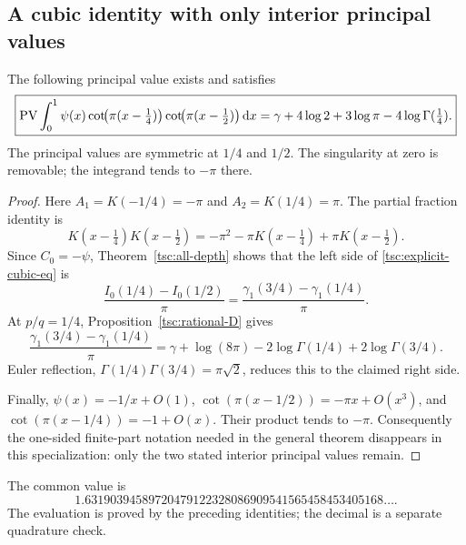 \subsection{A cubic identity with only interior principal values}
\begin{theorem}\label{tsc:explicit-cubic}
The following principal value exists and satisfies
\begin{align}\label{tsc:explicit-cubic-eq}
 \boxed{\displaystyle
 \operatorname{PV}\int_0^1\psi(x)
     \cot\!\bigl(\pi(x-\tfrac14)\bigr)
     \cot\!\bigl(\pi(x-\tfrac12)\bigr)\,\mathrm d x
  =\gamma+4\log2+3\log\pi-4\log\Gamma(\tfrac14).}
\end{align}
The principal values are symmetric at $1/4$ and $1/2$. The singularity at
zero is removable; the integrand tends to $-\pi$ there.
\end{theorem}
\begin{proof}
Here $A_1=K(-1/4)=-\pi$ and $A_2=K(1/4)=\pi$. The partial fraction
identity is
\[
 K(x-\tfrac14)K(x-\tfrac12)
        =-\pi^2-\pi K(x-\tfrac14)+\pi K(x-\tfrac12).
\]
Since $C_0=-\psi$, Theorem~\ref{tsc:all-depth} shows that the left side of
\eqref{tsc:explicit-cubic-eq} is
\[
 \frac{I_0(1/4)-I_0(1/2)}\pi
      =\frac{\gamma_1(3/4)-\gamma_1(1/4)}\pi.
\]
At $p/q=1/4$, Proposition~\ref{tsc:rational-D} gives
\[
 \frac{\gamma_1(3/4)-\gamma_1(1/4)}\pi
  =\gamma+\log(8\pi)-2\log\Gamma(1/4)+2\log\Gamma(3/4).
\]
Euler reflection, $\Gamma(1/4)\Gamma(3/4)=\pi\sqrt2$, reduces this to
the claimed right side.

Finally, $\psi(x)=-1/x+O(1)$,
$\cot(\pi(x-1/2))=-\pi x+O(x^3)$, and
$\cot(\pi(x-1/4))=-1+O(x)$. Their product tends to $-\pi$.
Consequently the one-sided finite-part notation needed in the general
theorem disappears in this specialization: only the two stated interior
principal values remain.
\end{proof}
The common value is
\[
 1.63190394589720479122328086909541565458453405168\ldots.
\]
The evaluation is proved by the preceding identities; the decimal is a
separate quadrature check.

